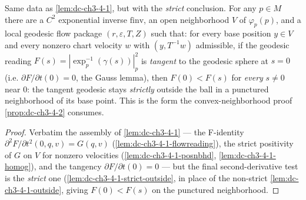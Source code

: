 \begin{lemma}
  \label{lem:dc-ch3-4-1-strict}


  Same data as \cref{lem:dc-ch3-4-1}, but with the \emph{strict} conclusion. For any
  $p\in M$ there are a $C^2$ exponential inverse $\mathrm{finv}$, an open neighborhood
  $V$ of $\varphi_p(p)$, and a local geodesic flow package $(r,\varepsilon,T,Z)$ such
  that: for every base position $y\in V$ and every nonzero chart velocity $w$ with
  $(y,T^{-1}w)$ admissible, if the geodesic reading $F(s)=|\exp_p^{-1}(\gamma(s))|_p^2$
  is \emph{tangent} to the geodesic sphere at $s=0$ (i.e. $\partial F/\partial t(0)=0$,
  the Gauss lemma), then $F(0)<F(s)$ for \emph{every} $s\neq0$ near $0$: the tangent
  geodesic stays \emph{strictly} outside the ball in a punctured neighborhood of its base
  point. This is the form the convex-neighborhood proof \cref{prop:dc-ch3-4-2} consumes.
\end{lemma}
\begin{proof}
  \sketch

  Verbatim the assembly of \cref{lem:dc-ch3-4-1} — the F-identity
  $\partial^2 F/\partial t^2(0,q,v)=G(q,v)$ (\cref{lem:dc-ch3-4-1-flowreading}), the strict
  positivity of $G$ on $V$ for nonzero velocities (\cref{lem:dc-ch3-4-1-posnbhd},
  \cref{lem:dc-ch3-4-1-homog}), and the tangency $\partial F/\partial t(0)=0$ — but the
  final second-derivative test is the \emph{strict} one (\cref{lem:dc-ch3-4-1-strict-outside},
  in place of the non-strict
  \cref{lem:dc-ch3-4-1-outside}, giving $F(0)<F(s)$ on the punctured neighborhood.
\end{proof}


